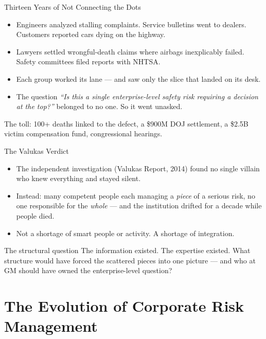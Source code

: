 \documentclass[11pt, aspectratio=169]{beamer}
\begin{document}
\begin{frame}{Thirteen Years of Not Connecting the Dots}
\begin{itemize}
  \item Engineers analyzed stalling complaints. Service bulletins went to dealers. Customers reported cars dying on the highway.
  \item Lawyers settled wrongful-death claims where airbags inexplicably failed. Safety committees filed reports with NHTSA.
  \item Each group worked its lane --- and saw only the slice that landed on its desk.
  \item The question \emph{``Is this a single enterprise-level safety risk requiring a decision at the top?''} belonged to \alert{no one}. So it went unasked.
\end{itemize}
\medskip
The toll: 100+ deaths linked to the defect, a \$900M DOJ settlement, a \$2.5B victim compensation fund, congressional hearings.
\end{frame}

\begin{frame}{The Valukas Verdict}
\begin{itemize}
  \item The independent investigation (Valukas Report, 2014) found no single villain who knew everything and stayed silent.
  \item Instead: many competent people each managing a \emph{piece} of a serious risk, no one responsible for the \emph{whole} --- and the institution drifted for a decade while people died.
  \item Not a shortage of smart people or activity. A shortage of \alert{integration}.
\end{itemize}
\medskip
\begin{block}{The structural question}
The information existed. The expertise existed. What structure would have forced the scattered pieces into one picture --- and who at GM should have owned the enterprise-level question?
\end{block}
\end{frame}

\section{The Evolution of Corporate Risk Management}
\end{document}
